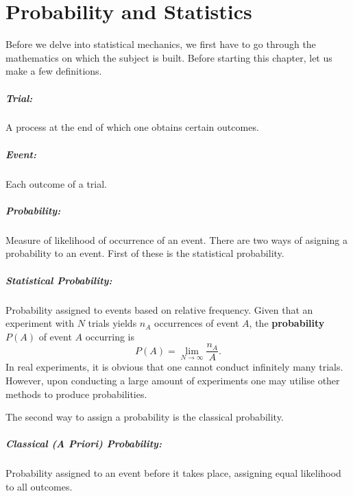 \chapter{Probability and Statistics}

    Before we delve into statistical mechanics, we first have to go through the mathematics on which the subject is built. Before starting this chapter, let us make a few definitions.
    \paragraph{Trial:}A process at the end of which one obtains certain outcomes.
    \paragraph{Event:}Each outcome of a trial.
    \paragraph{Probability:}Measure of likelihood of occurrence of an event.
    There are two ways of asigning a probability to an event. First of these is the statistical probability.
    \paragraph{Statistical Probability:}Probability assigned to events based on relative frequency. Given that an experiment with $N$ trials yields $n_A$ occurrences of event $A$, the \textbf{probability} $P(A)$ of event $A$ occurring is
    \begin{equation}
        P(A) = \lim_{N\to\infty}\frac{n_A}{A}.
    \end{equation}
    In real experiments, it is obvious that one cannot conduct infinitely many trials. However, upon conducting a large amount of experiments one may utilise other methods to produce probabilities.
    
    The second way to assign a probability is the classical probability.
    \paragraph{Classical (A Priori) Probability:}Probability assigned to an event before it takes place, assigning equal likelihood to all outcomes.
\newpage

